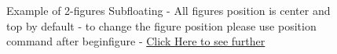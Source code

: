 \begin{figure}

    \caption{\label{fig_3}Example of 2-figures Subfloating - All figures position is center and top by default - to change the figure position please use position command after begin{figure} - \href{ https://www.overleaf.com/learn/latex/Positioning_of_Figures}{Click Here to see further}}
    
\end{figure}
